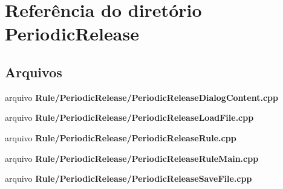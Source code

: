 \section{Referência do diretório Periodic\+Release}
\label{dir_d552474efd13f988b0a62ab1573e19dd}
\subsection*{Arquivos}
\begin{DoxyCompactItemize}
\item 
arquivo {\bf Rule/\+Periodic\+Release/\+Periodic\+Release\+Dialog\+Content.\+cpp}
\item 
arquivo {\bf Rule/\+Periodic\+Release/\+Periodic\+Release\+Load\+File.\+cpp}
\item 
arquivo {\bf Rule/\+Periodic\+Release/\+Periodic\+Release\+Rule.\+cpp}
\item 
arquivo {\bf Rule/\+Periodic\+Release/\+Periodic\+Release\+Rule\+Main.\+cpp}
\item 
arquivo {\bf Rule/\+Periodic\+Release/\+Periodic\+Release\+Save\+File.\+cpp}
\end{DoxyCompactItemize}
